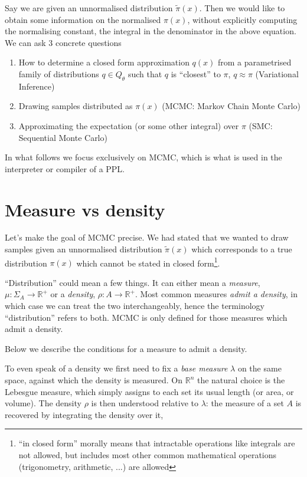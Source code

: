 Say we are given an unnormalised distribution $\tilde{\pi}(x)$. Then we would like to obtain some information on the normalised $\pi(x)$, without explicitly computing the normalising constant,
the integral in the denominator in the above equation.
We can ask 3 concrete questions \citep{pml, ppl}
\begin{enumerate}
\item How to determine a closed form approximation $q(x)$ from a parametrised family of distributions $q \in Q_\theta$ such that $q$ is ``closest'' to $\pi$, $q \approx \pi$ (Variational Inference)
\item Drawing samples distributed as $\pi(x)$ (MCMC: Markov Chain Monte Carlo)
\item Approximating the expectation (or some other integral) over $\pi$ (SMC: Sequential Monte Carlo)
\end{enumerate}

In what follows we focus exclusively on MCMC, which is what is used in the interpreter or compiler of a PPL.

\section{Measure vs density}
\label{sec:abs-cont}
Let's make the goal of MCMC precise. We had stated that we wanted to draw samples given an unnormalised distribution $\tilde{\pi}(x)$ which corresponds to a true distribution $\pi(x)$ which cannot
be stated in closed form\footnote{``in closed form'' morally means that intractable operations like integrals are not allowed, but includes most other common mathematical operations (trigonometry, arithmetic, ...) are allowed}.

``Distribution'' could mean a few things. It can either mean a \emph{measure}, $\mu : \Sigma_A \to \mathbb{R}^+$ or a \emph{density}, $\rho : A \to \mathbb{R}^+$. Most common measures \emph{admit a density}, in which case we can
treat the two interchangeably, hence the terminology ``distribution'' refers to both. MCMC is only defined for those measures which admit a density.

Below we describe the conditions for a measure to admit a density.

To even speak of a density we first need to fix a \emph{base measure} $\lambda$ on the same space, against which the density is measured. On $\mathbb{R}^n$ the natural
choice is the Lebesgue measure, which simply assigns to each set its usual length (or area, or volume). The density $\rho$ is then understood relative to $\lambda$: the
measure of a set $A$ is recovered by integrating the density over it,

